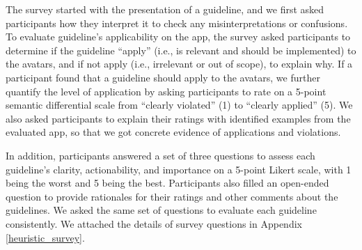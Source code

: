 
The survey started with the presentation of a guideline, and we first %
asked participants how they interpret it to check any misinterpretations or confusions. To evaluate guideline's applicability on the app, the survey asked participants to determine if the guideline ``apply'' (i.e., is relevant and should be implemented) to the avatars, and if not apply (i.e., irrelevant or out of scope), to explain why. If a participant found that a guideline should apply to the avatars, we further quantify the level of application by asking participants to rate on a 5-point semantic differential scale from ``clearly violated'' (1) to ``clearly applied'' (5). We also asked participants to explain their ratings with identified examples from the evaluated app, so that we got concrete evidence of applications and violations.

In addition, participants answered a set of three questions to assess each guideline's clarity, actionability, and importance on a 5-point Likert scale, with 1 being the worst and 5 being the best. %
Participants also filled an open-ended question to provide rationales for their ratings and other comments about the guidelines.
We asked the same set of questions to evaluate each guideline consistently. We attached the details of survey questions in Appendix \ref{heuristic_survey}.


